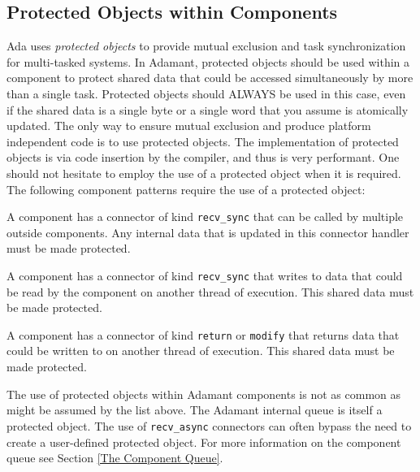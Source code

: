 \subsection{Protected Objects within Components}

Ada uses \textit{protected objects} to provide mutual exclusion and task synchronization for multi-tasked systems. In Adamant, protected objects should be used within a component to protect shared data that could be accessed simultaneously by more than a single task. Protected objects should ALWAYS be used in this case, even if the shared data is a single byte or a single word that you assume is atomically updated. The only way to ensure mutual exclusion and produce platform independent code is to use protected objects. The implementation of protected objects is via code insertion by the compiler, and thus is very performant. One should not hesitate to employ the use of a protected object when it is required. \\

The following component patterns require the use of a protected object:

\vspace{5mm} %
\begin{spaceditemize}
  \item A component has a connector of kind \texttt{recv\_sync} that can be called by multiple outside components. Any internal data that is updated in this connector handler must be made protected.
  \item A component has a connector of kind \texttt{recv\_sync} that writes to data that could be read by the component on another thread of execution. This shared data must be made protected.
  \item A component has a connector of kind \texttt{return} or \texttt{modify} that returns data that could be written to on another thread of execution. This shared data must be made protected.
\end{spaceditemize}
\vspace{5mm} %

The use of protected objects within Adamant components is not as common as might be assumed by the list above. The Adamant internal queue is itself a protected object. The use of \texttt{recv\_async} connectors can often bypass the need to create a user-defined protected object. For more information on the component queue see Section \ref{The Component Queue}. \\

